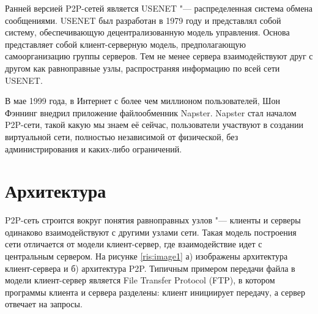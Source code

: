\documentclass[bachelor, och, coursework]{SCWorks}
\begin{document}
Ранней версией P2P-сетей является USENET "--- распределенная система обмена сообщениями. USENET 
был разработан в 1979 году и представлял собой систему, обеспечивающую децентрализованную модель управления. 
Основа представляет собой клиент-серверную модель, предполагающую самоорганизацию группы серверов. 
Тем не менее сервера взаимодействуют друг с другом как равноправные узлы, распространяя информацию по всей сети USENET.

В мае 1999 года, в Интернет с более чем миллионом пользователей, Шон Фэннинг внедрил приложение файлообменник Napster. 
Napster стал началом P2P-сети, такой какую мы знаем её сейчас, пользователи участвуют в создании виртуальной сети, 
полностью независимой от физической, без администрирования и каких-либо ограничений.

\section{Архитектура} %
P2P-сеть строится вокруг понятия равноправных узлов "--- клиенты и серверы одинаково взаимодействуют с другими узлами сети. 
Такая модель построения сети отличается от модели клиент-сервер, где взаимодействие идет с центральным сервером. 
На рисунке \ref{ris:image1} а) изображены архитектура клиент-сервера и б) архитектура P2P. 
Типичным примером передачи файла в модели клиент-сервер является File Transfer Protocol (FTP), 
в котором программы клиента и сервера разделены: клиент инициирует передачу, а сервер отвечает на запросы. 
\end{document}
